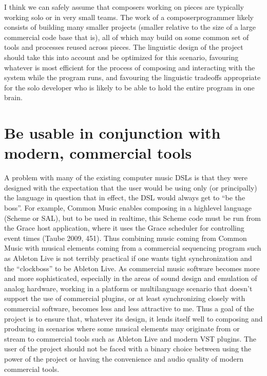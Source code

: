 \documentclass[letterpaper,10pt,english]{sphinxmanual}
\begin{document}
\sphinxAtStartPar
I think we can safely assume that composers working on pieces are typically working solo or in very small teams.
The work of a composer\sphinxhyphen{}programmer likely consists of building many smaller projects (smaller relative to the size of a large
commercial code base that is), all of which may build on some common set of tools and processes reused across pieces.
The linguistic design of the project should take this into account and be optimized for this scenario,
favouring whatever is most efficient for the process of composing and interacting with the system while the program runs,
and favouring the linguistic trade\sphinxhyphen{}offs appropriate for the solo developer who is likely to be able to
hold the entire program in one brain.


\section{Be usable in conjunction with modern, commercial tools}
\label{\detokenize{goals:be-usable-in-conjunction-with-modern-commercial-tools}}
\sphinxAtStartPar
A problem with many of the existing computer music DSLs is that they were designed with the
expectation that the user would be using only (or principally) the language in question \sphinxhyphen{} that in effect,
the DSL would always get to “be the boss”.
For example, Common Music enables composing in a high\sphinxhyphen{}level language (Scheme or SAL), but to be used in real\sphinxhyphen{}time,
this Scheme code must be run from the Grace host application, where it uses the Grace scheduler for
controlling event times (Taube 2009, 451).
Thus combining music coming from Common Music with musical elements coming from a commercial sequencing program such as
Ableton Live is not terribly practical if one wants tight synchronization and the “clock\sphinxhyphen{}boss” to be Ableton Live.
As commercial music software becomes more and more sophisticated, especially in the areas of sound design
and emulation of analog hardware, working in a platform or multi\sphinxhyphen{}language scenario that doesn’t support
the use of commercial plugins, or at least synchronizing closely with commercial software, becomes less and less attractive to me.
Thus a goal of the project is to ensure that, whatever its design, it lends itself well to composing and
producing in scenarios where some musical elements may originate from or stream to commercial tools such
as Ableton Live and modern VST plugins.
The user of the project should not be faced with a binary choice between using the power of the project or
having the convenience and audio quality of modern commercial tools.
\end{document}
